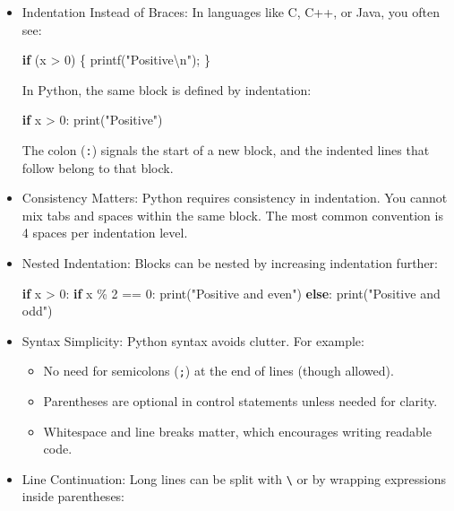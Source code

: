 \documentclass[
  letterpaper,
  DIV=11,
  numbers=noendperiod]{scrreprt}
\newenvironment{Shaded}{\begin{snugshade}}{\end{snugshade}}
\newcommand{\BuiltInTok}[1]{\textcolor[rgb]{0.00,0.23,0.31}{#1}}
\newcommand{\ControlFlowTok}[1]{\textcolor[rgb]{0.00,0.23,0.31}{\textbf{#1}}}
\newcommand{\DecValTok}[1]{\textcolor[rgb]{0.68,0.00,0.00}{#1}}
\newcommand{\NormalTok}[1]{\textcolor[rgb]{0.00,0.23,0.31}{#1}}
\newcommand{\OperatorTok}[1]{\textcolor[rgb]{0.37,0.37,0.37}{#1}}
\newcommand{\SpecialCharTok}[1]{\textcolor[rgb]{0.37,0.37,0.37}{#1}}
\newcommand{\StringTok}[1]{\textcolor[rgb]{0.13,0.47,0.30}{#1}}
\providecommand{\tightlist}{%
  \setlength{\itemsep}{0pt}\setlength{\parskip}{0pt}}
\begin{document}
\begin{itemize}
\item
  Indentation Instead of Braces: In languages like C, C++, or Java, you
  often see:

\begin{Shaded}
\begin{Highlighting}[]
\ControlFlowTok{if} \OperatorTok{(}\NormalTok{x }\OperatorTok{\textgreater{}} \DecValTok{0}\OperatorTok{)} \OperatorTok{\{}
\NormalTok{    printf}\OperatorTok{(}\StringTok{"Positive}\SpecialCharTok{\textbackslash{}n}\StringTok{"}\OperatorTok{);}
\OperatorTok{\}}
\end{Highlighting}
\end{Shaded}

  In Python, the same block is defined by indentation:

\begin{Shaded}
\begin{Highlighting}[]
\ControlFlowTok{if}\NormalTok{ x }\OperatorTok{\textgreater{}} \DecValTok{0}\NormalTok{:}
    \BuiltInTok{print}\NormalTok{(}\StringTok{"Positive"}\NormalTok{)}
\end{Highlighting}
\end{Shaded}

  The colon (\texttt{:}) signals the start of a new block, and the
  indented lines that follow belong to that block.
\item
  Consistency Matters: Python requires consistency in indentation. You
  cannot mix tabs and spaces within the same block. The most common
  convention is 4 spaces per indentation level.
\item
  Nested Indentation: Blocks can be nested by increasing indentation
  further:

\begin{Shaded}
\begin{Highlighting}[]
\ControlFlowTok{if}\NormalTok{ x }\OperatorTok{\textgreater{}} \DecValTok{0}\NormalTok{:}
    \ControlFlowTok{if}\NormalTok{ x }\OperatorTok{\%} \DecValTok{2} \OperatorTok{==} \DecValTok{0}\NormalTok{:}
        \BuiltInTok{print}\NormalTok{(}\StringTok{"Positive and even"}\NormalTok{)}
    \ControlFlowTok{else}\NormalTok{:}
        \BuiltInTok{print}\NormalTok{(}\StringTok{"Positive and odd"}\NormalTok{)}
\end{Highlighting}
\end{Shaded}
\item
  Syntax Simplicity: Python syntax avoids clutter. For example:

  \begin{itemize}
  \tightlist
  \item
    No need for semicolons (\texttt{;}) at the end of lines (though
    allowed).
  \item
    Parentheses are optional in control statements unless needed for
    clarity.
  \item
    Whitespace and line breaks matter, which encourages writing readable
    code.
  \end{itemize}
\item
  Line Continuation: Long lines can be split with
  \texttt{\textbackslash{}} or by wrapping expressions inside
  parentheses:


\end{itemize}
\end{document}
